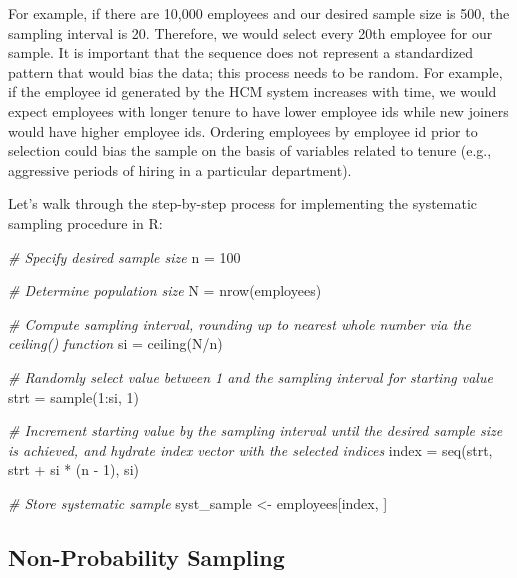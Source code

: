 \documentclass[
]{book}
\newenvironment{Shaded}{\begin{snugshade}}{\end{snugshade}}
\newcommand{\CommentTok}[1]{\textcolor[rgb]{0.56,0.35,0.01}{\textit{#1}}}
\newcommand{\DecValTok}[1]{\textcolor[rgb]{0.00,0.00,0.81}{#1}}
\newcommand{\FunctionTok}[1]{\textcolor[rgb]{0.00,0.00,0.00}{#1}}
\newcommand{\NormalTok}[1]{#1}
\newcommand{\OtherTok}[1]{\textcolor[rgb]{0.56,0.35,0.01}{#1}}
\newcommand{\SpecialCharTok}[1]{\textcolor[rgb]{0.00,0.00,0.00}{#1}}
\begin{document}
For example, if there are 10,000 employees and our desired sample size is 500, the sampling interval is 20. Therefore, we would select every 20th employee for our sample. It is important that the sequence does not represent a standardized pattern that would bias the data; this process needs to be random. For example, if the employee id generated by the HCM system increases with time, we would expect employees with longer tenure to have lower employee ids while new joiners would have higher employee ids. Ordering employees by employee id prior to selection could bias the sample on the basis of variables related to tenure (e.g., aggressive periods of hiring in a particular department).

Let's walk through the step-by-step process for implementing the systematic sampling procedure in R:

\begin{Shaded}
\begin{Highlighting}[]
\CommentTok{\# Specify desired sample size}
\NormalTok{n }\OtherTok{=} \DecValTok{100}

\CommentTok{\# Determine population size}
\NormalTok{N }\OtherTok{=} \FunctionTok{nrow}\NormalTok{(employees)}

\CommentTok{\# Compute sampling interval, rounding up to nearest whole number via the ceiling() function}
\NormalTok{si }\OtherTok{=} \FunctionTok{ceiling}\NormalTok{(N}\SpecialCharTok{/}\NormalTok{n)}

\CommentTok{\# Randomly select value between 1 and the sampling interval for starting value}
\NormalTok{strt }\OtherTok{=} \FunctionTok{sample}\NormalTok{(}\DecValTok{1}\SpecialCharTok{:}\NormalTok{si, }\DecValTok{1}\NormalTok{)}

\CommentTok{\# Increment starting value by the sampling interval until the desired sample size is achieved, and hydrate index vector with the selected indices}
\NormalTok{index }\OtherTok{=} \FunctionTok{seq}\NormalTok{(strt, strt }\SpecialCharTok{+}\NormalTok{ si }\SpecialCharTok{*}\NormalTok{ (n }\SpecialCharTok{{-}} \DecValTok{1}\NormalTok{), si)}

\CommentTok{\# Store systematic sample}
\NormalTok{syst\_sample }\OtherTok{\textless{}{-}}\NormalTok{ employees[index, ]}
\end{Highlighting}
\end{Shaded}

\hypertarget{non-probability-sampling}{%
\subsection{Non-Probability Sampling}\label{non-probability-sampling}}
\end{document}
